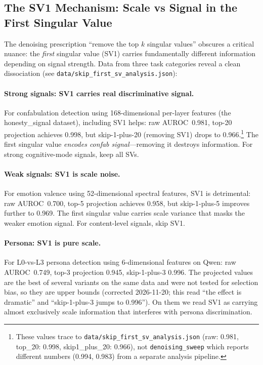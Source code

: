 \documentclass[11pt,a4paper]{article}
\begin{document}
\subsection{The SV1 Mechanism: Scale vs Signal in the First Singular Value}
\label{sec:sv1}

The denoising prescription ``remove the top $k$ singular values'' obscures a
critical nuance: the \emph{first} singular value (SV1) carries fundamentally
different information depending on signal strength. Data from three task
categories reveal a clean dissociation
(see \texttt{data/skip\_first\_sv\_analysis.json}):

\paragraph{Strong signals: SV1 carries real discriminative signal.}
For confabulation detection using 168-dimensional per-layer features (the
honesty\_signal dataset), including SV1 helps: raw AUROC~0.981, top-20
projection achieves 0.998, but skip-1-plus-20 (removing SV1) drops to 0.966.\footnote{These values trace to \texttt{data/skip\_first\_sv\_analysis.json} (raw: 0.981, top\_20: 0.998, skip1\_plus\_20: 0.966), not \texttt{denoising\_sweep} which reports different numbers (0.994, 0.983) from a separate analysis pipeline.}
The first singular value \emph{encodes confab signal}---removing it destroys
information. For strong cognitive-mode signals, keep all SVs.

\paragraph{Weak signals: SV1 is scale noise.}
For emotion valence using 52-dimensional spectral features, SV1 is
detrimental: raw AUROC~0.700, top-5 projection achieves 0.958, but
skip-1-plus-5 improves further to 0.969. The first singular value carries
scale variance that masks the weaker emotion signal. For content-level
signals, skip SV1.

\paragraph{Persona: SV1 is pure scale.}
For L0-vs-L3 persona detection using 6-dimensional features on Qwen:
raw AUROC~0.749, top-3 projection 0.945, skip-1-plus-3 0.996. The
projected values are the best of several variants on the same data and
were not tested for selection bias, so they are upper bounds (corrected
2026-11-20; this read ``the effect is dramatic'' and ``skip-1-plus-3 jumps
to 0.996''). On them we read SV1 as carrying almost exclusively
scale information that interferes with persona discrimination.
\end{document}
